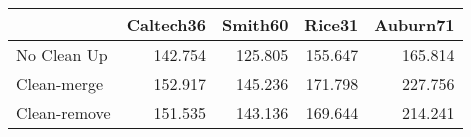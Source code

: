 \begin{tabular}{lrrrr}
\toprule
{} & Caltech36 & Smith60 &  Rice31 & Auburn71 \\
\midrule
No Clean Up  &   142.754 & 125.805 & 155.647 &  165.814 \\
Clean-merge  &   152.917 & 145.236 & 171.798 &  227.756 \\
Clean-remove &   151.535 & 143.136 & 169.644 &  214.241 \\
\bottomrule
\end{tabular}
